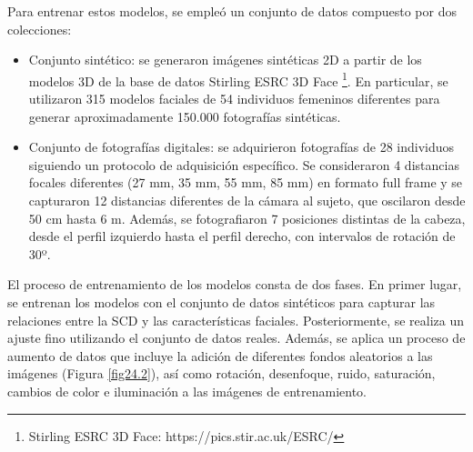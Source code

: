 Para entrenar estos modelos, se empleó un conjunto de datos compuesto por dos colecciones: 

\begin{itemize}
	\item Conjunto sintético: se generaron imágenes sintéticas 2D a partir de los modelos 3D de la base de datos Stirling ESRC 3D Face \footnote{Stirling ESRC 3D Face: https://pics.stir.ac.uk/ESRC/}. En particular, se utilizaron 315 modelos faciales de 54 individuos femeninos diferentes para generar aproximadamente 150.000 fotografías sintéticas.
	\item Conjunto de fotografías digitales: se adquirieron fotografías de 28 individuos siguiendo un protocolo de adquisición específico. Se consideraron 4 distancias focales diferentes (27 mm, 35 mm, 55 mm, 85 mm) en formato full frame y se capturaron 12 distancias diferentes de la cámara al sujeto, que oscilaron desde 50 cm hasta 6 m. Además, se fotografiaron 7 posiciones distintas de la cabeza, desde el perfil izquierdo hasta el perfil derecho, con intervalos de rotación de 30º. 
\end{itemize}


El proceso de entrenamiento de los modelos consta de dos fases. En primer lugar, se entrenan los modelos con el conjunto de datos sintéticos para capturar las relaciones entre la SCD y las características faciales. Posteriormente, se realiza un ajuste fino utilizando el conjunto de datos reales. Además, se aplica un proceso de aumento de datos que incluye la adición de diferentes fondos aleatorios a las imágenes (Figura \ref{fig24.2}), así como rotación, desenfoque, ruido, saturación, cambios de color e iluminación a las imágenes de entrenamiento.

